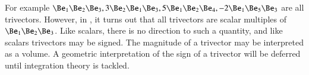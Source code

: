 For example \( \Be_1 \Be_2 \Be_3, 3 \Be_2 \Be_1 \Be_3, 5 \Be_1 \Be_2 \Be_4, - 2 \Be_1 \Be_5 \Be_3 \) are all trivectors.  However,
in , it turns out that all trivectors are scalar multiples of \( \Be_1 \Be_2 \Be_3 \).
Like scalars, there is no direction to such a quantity, and like scalars trivectors may be signed.  The magnitude of a trivector may be interpreted as a volume.
A geometric interpretation of the sign of a trivector will be deferred until integration theory is tackled.
